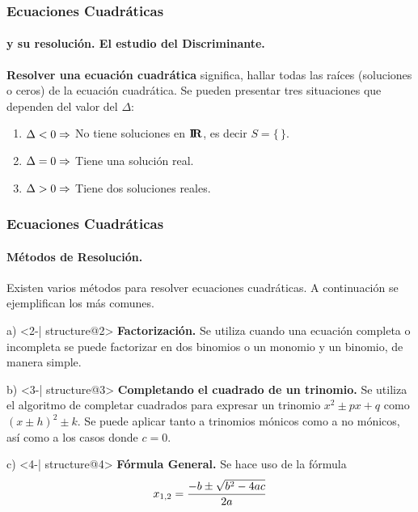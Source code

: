\documentclass[mathserif]{beamer}
\begin{document}
\begin{frame} 
\frametitle{\bf Ecuaciones Cuadráticas} 
\framesubtitle{y su resolución. El estudio del Discriminante.} 

\begin{definicion}[V]
{\bf Resolver una ecuación cuadrática} significa, hallar todas las raíces (soluciones o ceros) de la ecuación cuadrática. Se pueden presentar tres situaciones que dependen del valor del $\Delta$: 
\end{definicion}

\pause
\begin{enumerate} 
\item<2-| alert@2> $\Delta<0\Rightarrow$ No tiene soluciones en ${\bf I\!R}$, es decir $S=\{\,\}$. 
\item<3-| alert@3> $\Delta=0\Rightarrow$ Tiene una solución real.
\item<4-| alert@4> $\Delta>0\Rightarrow$ Tiene dos soluciones reales.
\end{enumerate}
\end{frame}


\begin{frame}
\frametitle{\bf Ecuaciones Cuadráticas} 
\framesubtitle{Métodos de Resolución.}

Existen varios métodos para resolver ecuaciones cuadráticas. A continuación se ejemplifican los más comunes.

\pause
\benu
    \item [a)] <2-| structure@2> {\bf Factorización.} Se utiliza cuando una ecuación completa o incompleta se puede facto\-ri\-zar en dos binomios o un monomio y un binomio, de manera simple.
    \item [b)] <3-| structure@3> {\bf Completando el cuadrado de un trinomio.} Se utiliza el algoritmo de completar cuadrados para expresar un trinomio $x^2\pm px+q$ como $(x\pm h)^2\pm k$. Se puede aplicar tanto a trinomios mónicos como a no mónicos, así como a los casos donde $c=0$.
    \item [c)] <4-| structure@4> {\bf Fórmula General.}
    Se hace uso de la fórmula {\bm $$\displaystyle x_{1,2}=\frac{-b\pm\sqrt{b^2-4ac}}{2a}$$}
\eenu
\end{frame}
\end{document}

